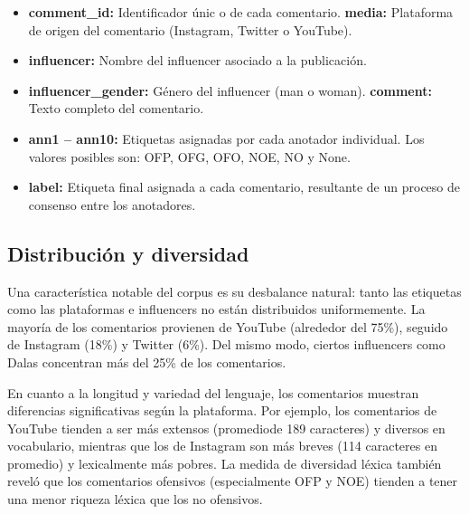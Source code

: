 \begin{itemize}
    \item \textbf{comment\_id:} Identificador únic o de cada comentario. \textbf{media:} Plataforma de origen del comentario (Instagram, Twitter o YouTube).
    \item \textbf{influencer:} Nombre del influencer asociado a la publicación.
    \item \textbf{influencer\_gender:} Género del influencer (man o woman). \textbf{comment:} Texto completo del comentario.
    \item \textbf{ann1 -- ann10:} Etiquetas asignadas por cada anotador individual. Los valores posibles son: OFP, OFG, OFO, NOE, NO y None.
    \item \textbf{label:} Etiqueta final asignada a cada comentario, resultante de un proceso de consenso entre los anotadores.
\end{itemize}

\subsection{Distribución y diversidad}

Una característica notable del corpus es su desbalance natural: tanto las etiquetas como las plataformas e influencers no están distribuidos uniformemente. La mayoría de los comentarios provienen de YouTube (alrededor del 75\%), seguido de Instagram (18\%) y Twitter (6\%). Del mismo modo, ciertos influencers como Dalas concentran más del 25\% de los comentarios.

En cuanto a la longitud y variedad del lenguaje, los comentarios muestran diferencias significativas según la plataforma. Por ejemplo, los comentarios de YouTube tienden a ser más extensos (promediode 189 caracteres) y diversos en vocabulario, mientras que los de Instagram son más breves (114 caracteres en promedio) y lexicalmente más pobres. La medida de diversidad léxica también reveló que los comentarios ofensivos (especialmente OFP y NOE) tienden a tener una menor riqueza léxica que los no ofensivos.


